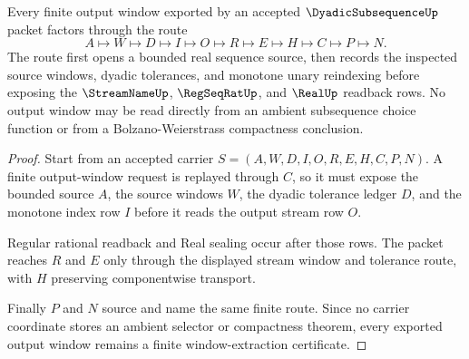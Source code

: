 \begin{theorem}
\label{thm:dyadic-subsequence-window-extraction}
Every finite output window exported by an accepted $\DyadicSubsequenceUp$ packet factors through the route
$$
A\longmapsto W\longmapsto D\longmapsto I\longmapsto O\longmapsto R\longmapsto E\longmapsto H\longmapsto C\longmapsto P\longmapsto N.
$$
The route first opens a bounded real sequence source, then records the inspected source windows, dyadic tolerances, and monotone unary reindexing before exposing the $\StreamNameUp$, $\RegSeqRatUp$, and $\RealUp$ readback rows. No output window may be read directly from an ambient subsequence choice function or from a Bolzano-Weierstrass compactness conclusion.
\end{theorem}
\begin{proof}
Start from an accepted carrier $S=(A,W,D,I,O,R,E,H,C,P,N)$. A finite output-window request is replayed through $C$, so it must expose the bounded source $A$, the source windows $W$, the dyadic tolerance ledger $D$, and the monotone index row $I$ before it reads the output stream row $O$.

Regular rational readback and Real sealing occur after those rows. The packet reaches $R$ and $E$ only through the displayed stream window and tolerance route, with $H$ preserving componentwise transport.

Finally $P$ and $N$ source and name the same finite route. Since no carrier coordinate stores an ambient selector or compactness theorem, every exported output window remains a finite window-extraction certificate.
\end{proof}


\begin{closurestatus}{\DyadicSubsequenceUp}
  \theoryclosure{\seedClosure}
  \formalstatus{\unformalizedV}
\end{closurestatus}
